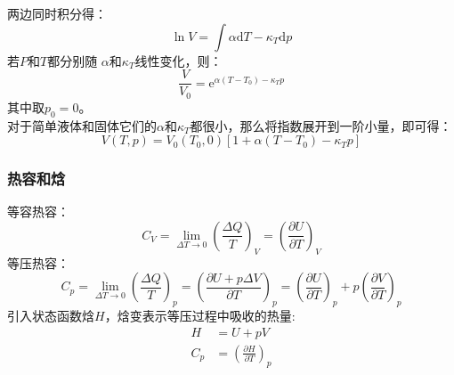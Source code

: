 \documentclass[12pt]{article}
\begin{document}
两边同时积分得：
\begin{equation}
	\ln V=\int{\alpha \text{d}T-{{\kappa }_{T}}\text{d}p}
\end{equation}
若$P$和$T$都分别随 $\alpha$和$\kappa_T$线性变化，则：
\begin{equation}
	\frac{V}{V_0}=\mathrm{e}^{\alpha (T-T_0)- \kappa_Tp}
\end{equation}
其中取$p_0=0$。\\
对于简单液体和固体它们的$\alpha$和$\kappa_T$都很小，那么将指数展开到一阶小量，即可得：
\begin{equation}
	V(T,p)=V_0(T_0,0)[1+\alpha (T-T_0)-\kappa_T p]
\end{equation}
\subsubsection{热容和焓}
\noindent
等容热容：
\begin{equation}
	C_V=\underset{\Delta T\to 0}{\mathop{\lim }}(\frac{\Delta Q}{T})_V=(\frac{\partial U}{\partial T})_V
\end{equation}
等压热容：
\begin{equation}
	C_p=\underset{\Delta T\to 0}{\mathop{\lim}}(\frac{\Delta Q}{T})_p=(\frac{\partial U+p\Delta V}{\partial T})_p=(\frac{\partial U}{\partial T})_p+p(\frac{\partial V}{\partial T})_p
\end{equation}
引入状态函数焓$H$，焓变表示等压过程中吸收的热量:
\begin{equation}
\begin{split}
	H&=U+pV	
\\	C_p&=(\frac{\partial H}{\partial T})_p	
\end{split}
\end{equation}
\end{document}
